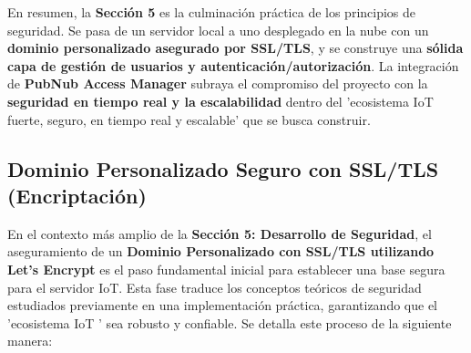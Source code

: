 \documentclass{report}
\begin{document}
En resumen, la \textbf{Sección 5} es la culminación práctica de los principios de seguridad. Se pasa de un servidor local a uno desplegado en la nube 
con un \textbf{dominio personalizado asegurado por SSL/TLS}, y se construye una \textbf{sólida capa de gestión de usuarios y autenticación/autorización}. 
La integración de \textbf{PubNub Access Manager} subraya el compromiso del proyecto con la \textbf{seguridad en tiempo real y la escalabilidad} dentro del 
'ecosistema IoT fuerte, seguro, en tiempo real y escalable' que se busca construir.

\subsection{Dominio Personalizado Seguro con SSL/TLS (Encriptación)}
En el contexto más amplio de la \textbf{Sección 5: Desarrollo de Seguridad}, el aseguramiento de un \textbf{Dominio Personalizado con SSL/TLS utilizando 
Let's Encrypt} es el paso fundamental inicial para establecer una base segura para el servidor IoT. Esta fase traduce los conceptos teóricos de seguridad 
estudiados previamente en una implementación práctica, garantizando que el  'ecosistema IoT ' sea robusto y confiable. Se detalla este proceso 
de la siguiente manera:
\end{document}
